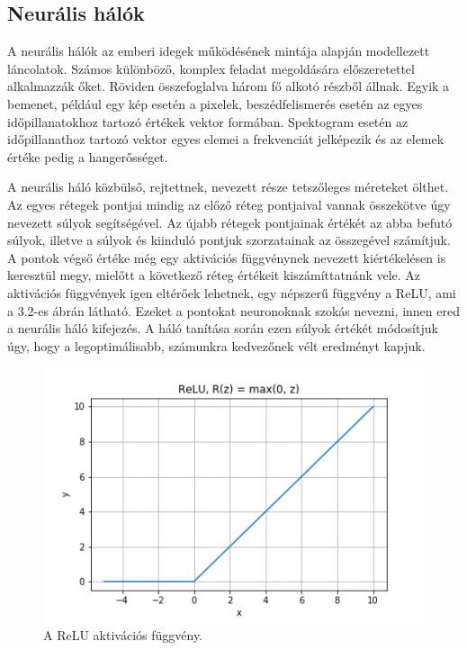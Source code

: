 \subsection{Neurális hálók}

A neurális hálók az emberi idegek működésének mintája alapján modellezett láncolatok. Számos különböző, komplex feladat megoldására előszeretettel alkalmazzák őket. Röviden összefoglalva három fő alkotó részből állnak. Egyik a bemenet, például egy kép esetén a pixelek, beszédfelismerés esetén az egyes időpillanatokhoz tartozó értékek vektor formában. Spektogram esetén az időpillanathoz tartozó vektor egyes elemei a frekvenciát jelképezik és az elemek értéke pedig a hangerősséget.

A neurális háló közbülső, rejtettnek, nevezett része tetszőleges méreteket ölthet. Az egyes rétegek pontjai mindig az előző réteg pontjaival vannak összekötve úgy nevezett súlyok segítségével. Az újabb rétegek pontjainak értékét az abba befutó súlyok, illetve a súlyok és kiinduló pontjuk szorzatainak az összegével számítjuk. A pontok végső értéke még egy aktivációs függvénynek nevezett kiértékelésen is keresztül megy, mielőtt a következő réteg értékeit kiszámíttatnánk vele. Az aktivációs függvények igen eltérőek lehetnek, egy népszerű függvény a ReLU, ami a 3.2-es ábrán látható. Ezeket a pontokat neuronoknak szokás nevezni, innen ered a neurális háló kifejezés. A háló tanítása során ezen súlyok értékét módosítjuk úgy, hogy a legoptimálisabb, számunkra kedvezőnek vélt eredményt kapjuk.

\begin{figure}[!ht]
\centering
\includegraphics[width=120mm, keepaspectratio]{figures/ReLU.png}
\caption{A ReLU aktivációs függvény.}
\end{figure}

